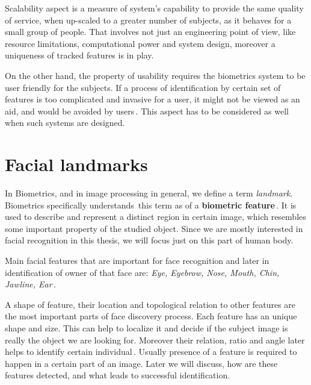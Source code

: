 Scalability aspect is a measure of system's capability to provide the same quality of service, when up-scaled to a greater number of subjects, as it behaves for a small group of people. That involves not just an engineering point of view, like resource limitations, computational power and system design, moreover a uniqueness of tracked features is in play.

On the other hand, the property of usability requires the biometrics system to be user friendly for the subjects. If a process of identification by certain set of features is too complicated and invasive for a user, it might not be viewed as an aid, and would be avoided by users\,\cite{nieto2002public}. This aspect has to be considered as well when such systems are designed.

\section{Facial landmarks}

In Biometrics, and in image processing in general, we define a term \textit{landmark}. Biometrics specifically understands\,\cite{handbook_bio} this term as of a \textbf{biometric feature}\,\cite{nixon2012feature}. It is used to describe and represent a distinct region in certain image, which resembles some important property of the studied object. Since we are mostly interested in facial recognition in this thesis, we will focus just on this part of human body.

Main facial features that are important for face recognition and later in identification of owner of that face are: \textit{Eye, Eyebrow, Nose, Mouth, Chin, Jawline, Ear}\,\cite{biometrie_drahan}.

A shape of feature, their location and topological relation to other features are the most important parts of face discovery process. Each feature has an unique shape and size. This can help to localize it and decide if the subject image is really the object we are looking for. Moreover their relation, ratio and angle later helps to identify certain individual\,\cite{video}. Usually presence of a feature is required to happen in a certain part of an image. Later we will discuss, how are these features detected, and what leads to successful identification.

